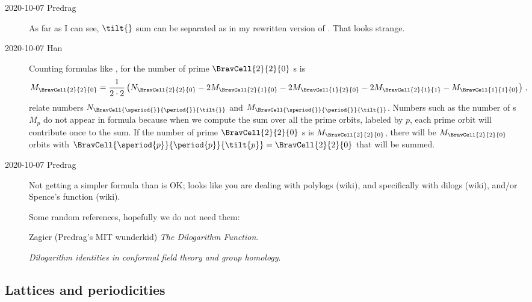 \begin{description}
    \item[2020-10-07 Predrag]
As far as I can see, $\tilt{}$ sum can be separated as in
my rewritten version of . That
looks strange.

    \item[2020-10-07 Han]
Counting formulas like , for
the number of prime
$\BravCell{2}{2}{0}$ {\lattstate}s is
\[
M_{\BravCell{2}{2}{0}} = \frac{1}{2\cdot2}
  \left( N_{\BravCell{2}{2}{0}}
            - 2M_{\BravCell{2}{1}{0}}
            - 2M_{\BravCell{1}{2}{0}}
            - 2M_{\BravCell{2}{1}{1}}
            - M_{\BravCell{1}{1}{0}}
  \right)
\,,
\] %
relate numbers $N_{\BravCell{\speriod{}}{\period{}}{\tilt{}}}$ and
$M_{\BravCell{\speriod{}}{\period{}}{\tilt{}}}$. Numbers such as the
number of {\orbit}s $M_{p}$  do not appear in formula
 because when we compute the sum over all the
prime orbits, labeled by $p$, each prime orbit will contribute once to
the sum. If the number of prime $\BravCell{2}{2}{0}$ {\lattstate}s is
$M_{\BravCell{2}{2}{0}}$, there will be $M_{\BravCell{2}{2}{0}}$ orbits
with $\BravCell{\speriod{p}}{\period{p}}{\tilt{p}}=\BravCell{2}{2}{0}$
that will be summed.


    \item[2020-10-07 Predrag]
Not getting a simpler formula than
 is OK; looks like you are dealing with
polylogs  {(wiki)},
and specifically with
dilogs  {(wiki)},
and/or Spence's function
 {(wiki)}.

Some random references, hopefully we do not need them:

Zagier (Predrag's MIT wunderkid)
{{\em  The Dilogarithm Function}}.

{{\em Dilogarithm identities in conformal field theory and group homology}}.

\end{description}

\subsection{Lattices and periodicities}
\label{s:BravaisLatt}

